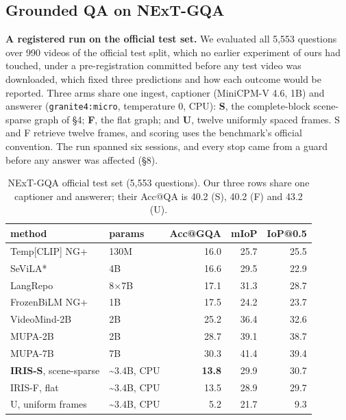 \documentclass[sigconf,review,anonymous]{acmart}
\begin{document}
\subsection{Grounded QA on NExT-GQA}

\textbf{A registered run on the official test set.} We evaluated all 5,553 questions over 990
videos of the official test split, which no earlier experiment of ours had touched, under a
pre-registration committed before any test video was downloaded, which fixed three
predictions and how each outcome would be reported. Three arms share one
ingest, captioner (MiniCPM-V 4.6, 1B) and answerer (\texttt{granite4:micro}, temperature 0, CPU):
\textbf{S}, the complete-block scene-sparse graph of §4; \textbf{F}, the flat graph; and \textbf{U},
twelve uniformly spaced frames. S and F retrieve twelve frames, and scoring uses the
benchmark's official convention. The run spanned six sessions, and every stop came from a guard
before any answer was affected (§8).

\begin{table}[t]
\footnotesize
\setlength{\tabcolsep}{4pt}
\caption{NExT-GQA official test set (5,553 questions). Our three rows share one captioner and answerer; their Acc@QA is 40.2 (S), 40.2 (F) and 43.2 (U).}
\begin{tabular}{llrrr}
\toprule
method & params & Acc@GQA & mIoP & IoP@0.5 \\
\midrule
Temp{[}CLIP{]} NG+ & 130M & 16.0 & 25.7 & 25.5 \\
SeViLA* & 4B & 16.6 & 29.5 & 22.9 \\
LangRepo & 8\ensuremath{\times}7B & 17.1 & 31.3 & 28.7 \\
FrozenBiLM NG+ & 1B & 17.5 & 24.2 & 23.7 \\
VideoMind-2B & 2B & 25.2 & 36.4 & 32.6 \\
MUPA-2B & 2B & 28.7 & 39.1 & 38.7 \\
MUPA-7B & 7B & 30.3 & 41.4 & 39.4 \\
\midrule
\textbf{IRIS-S}, scene-sparse & \textasciitilde3.4B, CPU & \textbf{13.8} & 29.9 & 30.7 \\
IRIS-F, flat & \textasciitilde3.4B, CPU & 13.5 & 28.9 & 29.7 \\
U, uniform frames & \textasciitilde3.4B, CPU & 5.2 & 21.7 & 9.3 \\
\bottomrule
\end{tabular}
\end{table}
\end{document}
